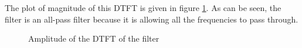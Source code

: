 \documentclass[journal,12pt,twocolumn]{IEEEtran}
\begin{document}
The plot of magnitude of this DTFT is given in figure \ref{DTFT}. As can be seen, the filter is an all-pass filter because it is allowing all the frequencies to pass through.
\begin{figure}[t]
    \centering
    \caption{Amplitude of the DTFT of the filter}
    \label{DTFT}
\end{figure}
\end{document}
